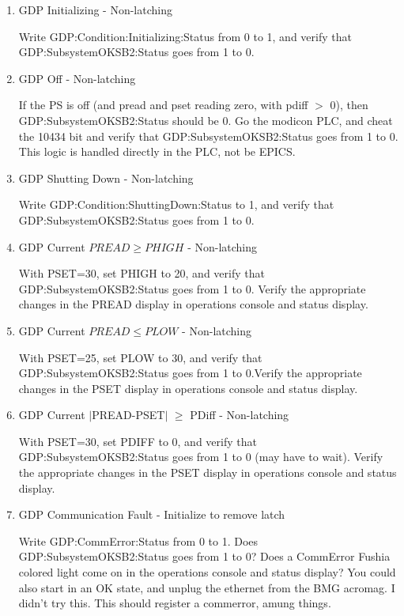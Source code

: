 \documentclass[11pt]{book}		%
\begin{document}
\begin{enumerate}
 \item GDP Initializing - Non-latching

\color{red}

Write GDP:Condition:Initializing:Status from 0 to 1, and verify that GDP:SubsystemOKSB2:Status goes from 1 to 0.

\color{black}

 \item GDP Off - Non-latching

\color{red}
If the PS is off (and pread and pset reading zero, with pdiff $>$ 0), then GDP:SubsystemOKSB2:Status should be 0. Go the modicon PLC, and cheat the 10434 bit and verify that GDP:SubsystemOKSB2:Status goes from 1 to 0. This logic is handled directly in the PLC, not be EPICS.

\color{black}

 \item GDP Shutting Down - Non-latching

\color{red}
Write GDP:Condition:ShuttingDown:Status to 1, and verify that GDP:SubsystemOKSB2:Status goes from 1 to 0.
\color{black}

 \item GDP Current $PREAD \geq PHIGH$ - Non-latching

\color{red}
With PSET=30, set PHIGH to 20, and verify that GDP:SubsystemOKSB2:Status goes from 1 to 0. Verify the appropriate changes in the PREAD display in operations console and status display.
\color{black}

 \item GDP Current $PREAD \leq PLOW$ - Non-latching

\color{red}
With PSET=25, set PLOW to 30, and verify that GDP:SubsystemOKSB2:Status goes from 1 to 0.Verify the appropriate changes in the PSET display in operations console and status display.
\color{black}

 \item GDP Current $\mid$PREAD-PSET$\mid$  $\geq$ PDiff - Non-latching

\color{red}
With PSET=30, set PDIFF to 0, and verify that GDP:SubsystemOKSB2:Status goes from 1 to 0 (may have to wait). Verify the appropriate changes in the PSET display in operations console and status display.
\color{black}

 \item GDP Communication Fault - Initialize to remove latch

\color{red}
Write GDP:CommError:Status from 0 to 1. Does GDP:SubsystemOKSB2:Status goes from 1 to 0? Does a CommError Fushia colored light come on in the operations console and status display? You could also start in an OK state, and unplug the ethernet from the BMG acromag. I didn't try this. This should register a commerror, amung things.
\color{black}


\end{enumerate}
\end{document}
